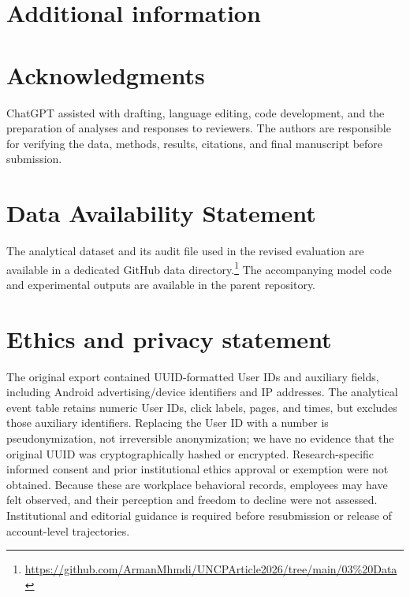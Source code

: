\documentclass[sn-mathphys-num, Numbered]{sn-jnl}%
\theoremstyle{thmstyleone}%
\theoremstyle{thmstyletwo}%
\theoremstyle{thmstylethree}%
\providecommand{\DIFadd}[1]{{\protect\color{green!40!black}#1}} %
\providecommand{\DIFdel}[1]{}                      %
\providecommand{\DIFaddbegin}{} %
\providecommand{\DIFaddend}{} %
\providecommand{\DIFdelbegin}{} %
\providecommand{\DIFdelend}{} %
\newcommand{\DIFscaledelfig}{0.5}
\newlength{\DIFdelgraphicswidth} %
\newlength{\DIFdelgraphicsheight} %
\newcommand{\DIFaddincludegraphics}[2][]{{\color{blue}\fbox{\DIFOincludegraphics[#1]{#2}}}} %
\newcommand{\DIFdelincludegraphics}[2][]{%
\sbox{\DIFdelgraphicsbox}{\DIFOincludegraphics[#1]{#2}}%
\settoboxwidth{\DIFdelgraphicswidth}{\DIFdelgraphicsbox} %
\settoboxtotalheight{\DIFdelgraphicsheight}{\DIFdelgraphicsbox} %
\scalebox{\DIFscaledelfig}{%
\parbox[b]{\DIFdelgraphicswidth}{\usebox{\DIFdelgraphicsbox}\\[-\baselineskip] \rule{\DIFdelgraphicswidth}{0em}}\llap{\resizebox{\DIFdelgraphicswidth}{\DIFdelgraphicsheight}{%
\setlength{\unitlength}{\DIFdelgraphicswidth}%
\begin{picture}(1,1)%
\thicklines\linethickness{2pt} %
{\color[rgb]{1,0,0}\put(0,0){\framebox(1,1){}}}%
{\color[rgb]{1,0,0}\put(0,0){\line( 1,1){1}}}%
{\color[rgb]{1,0,0}\put(0,1){\line(1,-1){1}}}%
\end{picture}%
}\hspace*{3pt}}} %
} %
\DeclareRobustCommand{\DIFaddbegin}{\DIFOaddbegin \let\includegraphics\DIFaddincludegraphics} %
\DeclareRobustCommand{\DIFaddend}{\DIFOaddend \let\includegraphics\DIFOincludegraphics} %
\DeclareRobustCommand{\DIFdelbegin}{\DIFOdelbegin \let\includegraphics\DIFdelincludegraphics} %
\DeclareRobustCommand{\DIFdelend}{\DIFOaddend \let\includegraphics\DIFOincludegraphics} %
\begin{document}
\section*{Additional information}

\section*{Acknowledgments}
\DIFdelbegin \DIFdel{The authors thank the AI tool ChatGPT for assistance in language editingand improving the text flow. This tool was used solely for editing suggestions, and all final content was reviewed and approved by the human authors.
Full responsibility for any errors or inaccuracies lies with the authors.

}\DIFdelend \DIFaddbegin \DIFadd{ChatGPT assisted with drafting, language editing, code development, and the preparation of analyses and responses to reviewers. The authors are responsible for verifying the data, methods, results, citations, and final manuscript before submission.
}\DIFaddend 

\section*{Data Availability Statement}
\DIFaddbegin \DIFadd{The analytical dataset and its audit file used in the revised evaluation are available in a dedicated GitHub data directory.\footnote{\url{https://github.com/ArmanMhmdi/UNCPArticle2026/tree/main/03\%20Data}} The accompanying model code and experimental outputs are available in the parent repository.}
\DIFaddend

\DIFaddbegin \section*{\DIFadd{Ethics and privacy statement}}
\DIFadd{The original export contained UUID-formatted User IDs and auxiliary fields, including Android advertising/device identifiers and IP addresses. The analytical event table retains numeric User IDs, click labels, pages, and times, but excludes those auxiliary identifiers. Replacing the User ID with a number is pseudonymization, not irreversible anonymization; we have no evidence that the original UUID was cryptographically hashed or encrypted. Research-specific informed consent and prior institutional ethics approval or exemption were not obtained. Because these are workplace behavioral records, employees may have felt observed, and their perception and freedom to decline were not assessed. Institutional and editorial guidance is required before resubmission or release of account-level trajectories.
}
\end{document}
